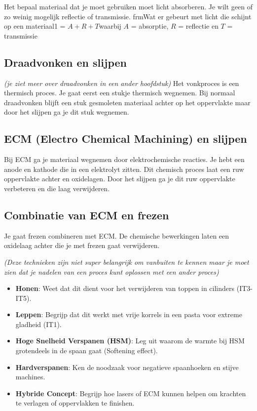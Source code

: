 \documentclass[a4paper,12pt,twoside]{report}
\begin{document}
Het bepaal materiaal dat je moet gebruiken moet licht absorberen. Je wilt geen of zo weinig mogelijk reflectie of transmissie.
\newline
frm{Wat er gebeurt met licht die schijnt op een materiaal}{1 = $A+R+T$}{waarbij $A$ = absorptie, $R$ = reflectie en $T$ = transmissie}

\subsection{Draadvonken en slijpen}
\textit{(je ziet meer over draadvonken in een ander hoofdstuk)}
Het vonkproces is een thermisch proces. Je gaat eerst een stukje thermisch wegnemen. Bij normaal draadvonken
blijft een stuk gesmoleten materiaal achter op het oppervlakte maar door het slijpen ga je dit stuk wegnemen.

\subsection{ECM (Electro Chemical Machining) en slijpen}
Bij ECM ga je materiaal wegnemen door elektrochemische reacties.
Je hebt een anode en kathode die in een elektrolyt zitten.
Dit chemisch proces laat een ruw oppervlakte achter en oxidelagen.
Door het slijpen ga je dit ruw oppervlakte verbeteren en die laag verwijderen.

\subsection{Combinatie van ECM en frezen}
Je gaat frezen combineren met ECM.
De chemische bewerkingen laten een oxidelaag achter die je met frezen gaat verwijderen.

\textit{(Deze technieken zijn niet super belangrijk om vanbuiten te kennen maar je moet zien dat je nadelen van een proces kunt oplossen met een ander proces)}

\begin{warningbox}[title=EXAMEN CHECKLIST: HYBRIDETECHNIEKEN]
    \begin{itemize}
        \item \textbf{Honen}: Weet dat dit dient voor het verwijderen van toppen in cilinders (IT3-IT5).
        \item \textbf{Leppen}: Begrijp dat dit werkt met vrije korrels in een pasta voor extreme gladheid (IT1).
        \item \textbf{Hoge Snelheid Verspanen (HSM)}: Leg uit waarom de warmte bij HSM grotendeels in de spaan gaat (Softening effect).
        \item \textbf{Hardverspanen}: Ken de noodzaak voor negatieve spaanhoeken en stijve machines.
        \item \textbf{Hybride Concept}: Begrijp hoe lasers of ECM kunnen helpen om krachten te verlagen of oppervlakken te finishen.
    \end{itemize}
\end{warningbox}
\end{document}
